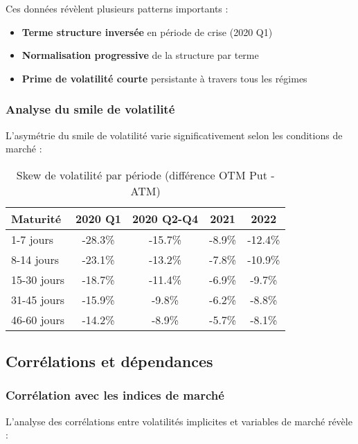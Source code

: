 \begin{table}[H]
Ces données révèlent plusieurs patterns importants :
\begin{itemize}
\item \textbf{Terme structure inversée} en période de crise (2020 Q1)
\item \textbf{Normalisation progressive} de la structure par terme
\item \textbf{Prime de volatilité courte} persistante à travers tous les régimes
\end{itemize}

\subsubsection{Analyse du smile de volatilité}

L'asymétrie du smile de volatilité varie significativement selon les conditions de marché :

\begin{table}[H]
\centering
\caption{Skew de volatilité par période (différence OTM Put - ATM)}
\begin{tabular}{@{}lcccc@{}}
\toprule
\textbf{Maturité} & \textbf{2020 Q1} & \textbf{2020 Q2-Q4} & \textbf{2021} & \textbf{2022} \\
\midrule
1-7 jours & -28.3\% & -15.7\% & -8.9\% & -12.4\% \\
8-14 jours & -23.1\% & -13.2\% & -7.8\% & -10.9\% \\
15-30 jours & -18.7\% & -11.4\% & -6.9\% & -9.7\% \\
31-45 jours & -15.9\% & -9.8\% & -6.2\% & -8.8\% \\
46-60 jours & -14.2\% & -8.9\% & -5.7\% & -8.1\% \\
\bottomrule
\end{tabular}
\end{table}

\subsection{Corrélations et dépendances}

\subsubsection{Corrélation avec les indices de marché}

L'analyse des corrélations entre volatilités implicites et variables de marché révèle :


\end{table}
